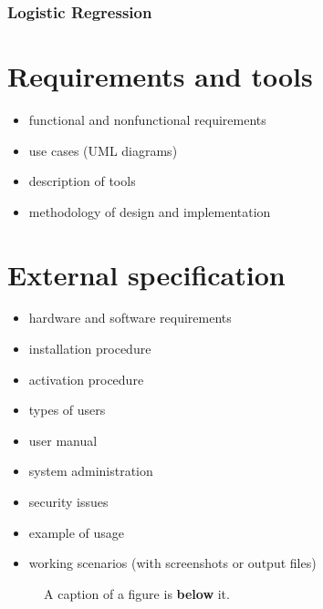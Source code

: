 \documentclass[a4paper,twoside,12pt]{book}
\begin{document}
\subsection{Logistic Regression}






\chapter{Requirements and tools}

\begin{itemize}
\item functional and nonfunctional requirements
\item use cases (UML diagrams)
\item description of tools
\item methodology of design and implementation
\end{itemize}


\chapter{External specification}
\begin{itemize}
\item hardware and software requirements
\item installation procedure
\item activation procedure
\item types of users
\item user manual
\item system administration
\item security issues
\item example of usage
\item working scenarios (with screenshots or output files)
\end{itemize}

\begin{figure}
\centering
{}
\caption{A caption of a figure is \textbf{below} it.}
\label{fig:2}
\end{figure}
\end{document}
